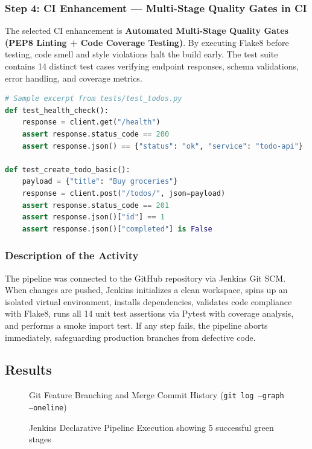 \documentclass[12pt,a4paper]{article}
\begin{document}
\subsubsection*{Step 4: CI Enhancement --- Multi-Stage Quality Gates in CI}
The selected CI enhancement is \textbf{Automated Multi-Stage Quality Gates (PEP8 Linting + Code Coverage Testing)}. By executing Flake8 before testing, code smell and style violations halt the build early. The test suite contains 14 distinct test cases verifying endpoint responses, schema validations, error handling, and coverage metrics.

\begin{lstlisting}[language=Python]
# Sample excerpt from tests/test_todos.py
def test_health_check():
    response = client.get("/health")
    assert response.status_code == 200
    assert response.json() == {"status": "ok", "service": "todo-api"}

def test_create_todo_basic():
    payload = {"title": "Buy groceries"}
    response = client.post("/todos/", json=payload)
    assert response.status_code == 201
    assert response.json()["id"] == 1
    assert response.json()["completed"] is False
\end{lstlisting}

\subsubsection*{Description of the Activity}
The pipeline was connected to the GitHub repository via Jenkins Git SCM. When changes are pushed, Jenkins initializes a clean workspace, spins up an isolated virtual environment, installs dependencies, validates code compliance with Flake8, runs all 14 unit test assertions via Pytest with coverage analysis, and performs a smoke import test. If any step fails, the pipeline aborts immediately, safeguarding production branches from defective code.

\subsection*{Results}

\begin{figure}[htbp]
\centering
\caption{Git Feature Branching and Merge Commit History (\texttt{git log --graph --oneline})}
\end{figure}

\begin{figure}[htbp]
\centering
\caption{Jenkins Declarative Pipeline Execution showing 5 successful green stages}
\end{figure}
\end{document}
